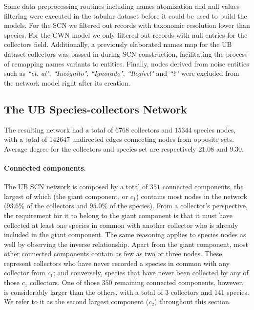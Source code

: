 Some data preprocessing routines including names atomization and null values filtering were executed in the tabular dataset before it could be used to build the models. 
For the SCN we filtered out records with taxonomic resolution lower than species.
For the CWN model we only filtered out records with null entries for the collectors field.
Additionally, a previously elaborated names map for the UB dataset collectors was passed in during SCN construction, facilitating the process of remapping names variants to entities. 
Finally, nodes derived from noise entities such as \textit{``et. al"}, \textit{``Incógnito"}, \textit{``Ignorado"}, \textit{``Ilegível"} and \textit{``?"} were excluded from the network model right after its creation.




\subsection{The UB Species-collectors Network}

The resulting network had a total of $6768$ collectors and $15344$ species nodes, with a total of $142647$ undirected edges connecting nodes from opposite sets. 
Average degree for the collectors and species set are respectively $21.08$ and $9.30$.

\paragraph*{Connected components.}
The UB SCN network is composed by a total of $351$ connected components, the largest of which (the giant component, or $c_1$) contains most nodes in the network ($93.6\%$ of the collectors and $95.0\%$ of the species). 
From a collector's perspective, the requirement for it to belong to the giant component is that it must have collected at least one species in common with another collector who is already included in the giant component. The same reasoning applies to species nodes as well by observing the inverse relationship.
Apart from the giant component, most other connected components contain as few as two or three nodes. These represent collectors who have never recorded a species in common with any collector from $c_1$; and conversely, species that have never been collected by any of those $c_1$ collectors.
One of those $350$ remaining connected components, however, is considerably larger than the others, with a total of $3$ collectors and $141$ species. We refer to it as the second largest component ($c_2$) throughout this section.


